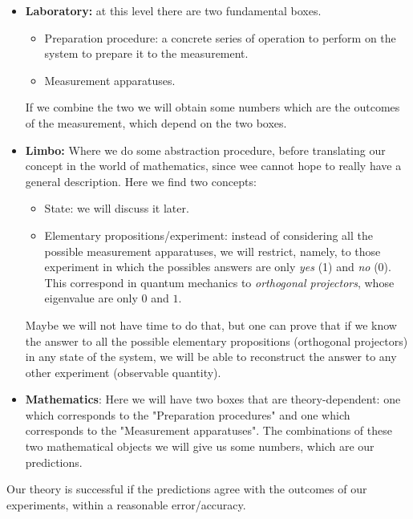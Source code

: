 \documentclass[../main.tex]{subfiles}
\begin{document}
\begin{itemize}
    \item \textbf{Laboratory:} at this level there are two fundamental boxes.
    \begin{itemize}
        \item {}Preparation procedure: a concrete series of operation to perform on the system to prepare it to the measurement.
        \item {}Measurement apparatuses.
    \end{itemize}
    If we combine the two we will obtain some numbers which are the outcomes of the measurement, which depend on the two boxes.
    \item \textbf{Limbo:} Where we do some abstraction procedure, before translating our concept in the world of mathematics, since wee cannot hope to really have a general description. Here we find two concepts:
    \begin{itemize}
        \item {}State: we will discuss it later.
        \item {}Elementary propositions/experiment: instead of considering all the possible measurement apparatuses, we will restrict, namely, to those experiment in which the possibles answers are only \textit{yes} (1) and \textit{no} (0). This correspond in quantum mechanics to  \textit{orthogonal projectors}, whose eigenvalue are only $0$ and $1$.
    \end{itemize}
    Maybe we will not have time to do that, but one can prove that if we know the answer to all the possible elementary propositions (orthogonal projectors) in any state of the system, we will be able to reconstruct the answer to any other experiment (observable quantity).
    \item \textbf{Mathematics}: Here we will have two boxes that are theory-dependent: one which corresponds to the "Preparation procedures" and one which corresponds to the "Measurement apparatuses". The combinations of these two mathematical objects we will give us some numbers, which are our predictions.
\end{itemize}
Our theory is successful if the predictions agree with the outcomes of our experiments, within a reasonable error/accuracy.
\end{document}
